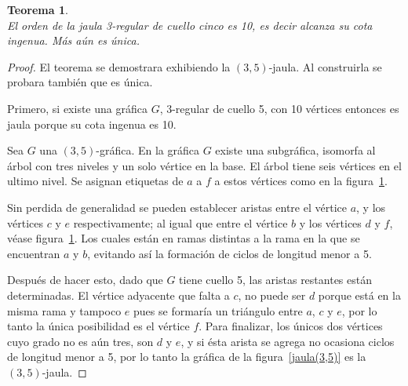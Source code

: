 \documentclass[12pt]{book}
\newtheorem{theorem}{Teorema}
\theoremstyle{definition}
\begin{document}
\begin{theorem}\textbf{}\\\label{teo(3,5)-jaula}
El orden de la jaula 3-regular de cuello cinco es 10, es decir alcanza
su cota ingenua. Más aún es única. 
\end{theorem}

\begin{proof}
El teorema se demostrara exhibiendo la $(3,5)$-jaula. Al construirla se
probara también que es única. 

Primero, si existe una gráfica $G$, 3-regular de cuello 5, con 10 vértices
entonces es jaula porque su cota ingenua es 10. 

Sea $G$ una $(3,5)$-gráfica. En la gráfica  $G$ existe una subgráfica,
isomorfa al árbol con tres niveles y un solo vértice en la base. El
árbol tiene seis vértices en el ultimo nivel. Se asignan etiquetas de
$a$ a $f$ a estos vértices como en la figura~\ref{arbol(3,5)}.


Sin perdida de generalidad se pueden establecer aristas entre el vértice $a$, y los
vértices $c$ y $e$ respectivamente; al igual que entre el vértice $b$
y los vértices $d$ y $f$, véase figura~\ref{arbol(3,5)}. Los cuales están en ramas
distintas a la rama en la que se encuentran $a$ y $b$, evitando así la formación de ciclos de longitud menor a 5.


\begin{figure}[htb]
  \centering
  \caption{} \label{arbol(3,5)}
\end{figure}

Después de hacer esto, dado que $G$ tiene cuello 5, las aristas restantes están
determinadas. El vértice adyacente que falta a $c$, no puede ser $d$
porque está en la misma rama y tampoco $e$ pues se formaría un triángulo entre $a$, $c$ y
$e$, por lo tanto la única posibilidad es el vértice $f$. Para
finalizar, los únicos dos vértices cuyo grado no es aún tres, son $d$
y $e$, y si ésta arista se agrega no ocasiona ciclos de longitud menor a
5, por lo tanto la gráfica de la figura~\ref{jaula(3,5)} es la $(3,5)$-jaula.


\end{proof}
\end{document}
